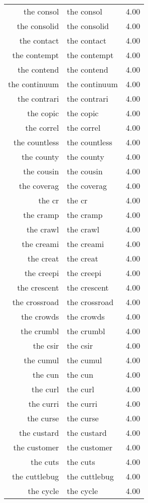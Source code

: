\begin{table}[ht]
\begin{tabular}{rlr}
  the consol & the consol & 4.00 \\ 
  the consolid & the consolid & 4.00 \\ 
  the contact & the contact & 4.00 \\ 
  the contempt & the contempt & 4.00 \\ 
  the contend & the contend & 4.00 \\ 
  the continuum & the continuum & 4.00 \\ 
  the contrari & the contrari & 4.00 \\ 
  the copic & the copic & 4.00 \\ 
  the correl & the correl & 4.00 \\ 
  the countless & the countless & 4.00 \\ 
  the county & the county & 4.00 \\ 
  the cousin & the cousin & 4.00 \\ 
  the coverag & the coverag & 4.00 \\ 
  the cr & the cr & 4.00 \\ 
  the cramp & the cramp & 4.00 \\ 
  the crawl & the crawl & 4.00 \\ 
  the creami & the creami & 4.00 \\ 
  the creat & the creat & 4.00 \\ 
  the creepi & the creepi & 4.00 \\ 
  the crescent & the crescent & 4.00 \\ 
  the crossroad & the crossroad & 4.00 \\ 
  the crowds & the crowds & 4.00 \\ 
  the crumbl & the crumbl & 4.00 \\ 
  the csir & the csir & 4.00 \\ 
  the cumul & the cumul & 4.00 \\ 
  the cun & the cun & 4.00 \\ 
  the curl & the curl & 4.00 \\ 
  the curri & the curri & 4.00 \\ 
  the curse & the curse & 4.00 \\ 
  the custard & the custard & 4.00 \\ 
  the customer & the customer & 4.00 \\ 
  the cuts & the cuts & 4.00 \\ 
  the cuttlebug & the cuttlebug & 4.00 \\ 
  the cycle & the cycle & 4.00 \\ 

\end{tabular}
\end{table}
